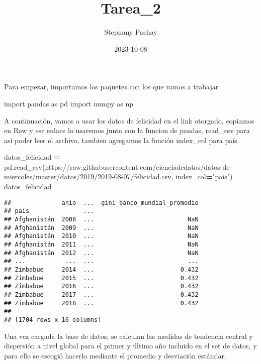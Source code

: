 \documentclass[
]{article}
\title{Tarea\_2}
\author{Stephany Pachay}
\date{2023-10-08}
\newenvironment{Shaded}{\begin{snugshade}}{\end{snugshade}}
\newcommand{\ImportTok}[1]{#1}
\newcommand{\NormalTok}[1]{#1}
\newcommand{\OperatorTok}[1]{\textcolor[rgb]{0.81,0.36,0.00}{\textbf{#1}}}
\newcommand{\StringTok}[1]{\textcolor[rgb]{0.31,0.60,0.02}{#1}}
\begin{document}
\maketitle

Para empezar, importamos los paquetes con los que vamos a trabajar

\begin{Shaded}
\begin{Highlighting}[]
\ImportTok{import}\NormalTok{ pandas }\ImportTok{as}\NormalTok{ pd}
\ImportTok{import}\NormalTok{ numpy }\ImportTok{as}\NormalTok{ np}
\end{Highlighting}
\end{Shaded}

A continuación, vamos a usar los datos de felicidad en el link otorgado,
copiamos en Raw y ese enlace lo usaremos junto con la funcion de pandas,
read\_csv para así poder leer el archivo, tambien agregamos la función
index\_col para país.

\begin{Shaded}
\begin{Highlighting}[]
\NormalTok{datos\_felicidad }\OperatorTok{=}\NormalTok{ pd.read\_csv(}\StringTok{\textquotesingle{}https://raw.githubusercontent.com/cienciadedatos/datos{-}de{-}miercoles/master/datos/2019/2019{-}08{-}07/felicidad.csv\textquotesingle{}}\NormalTok{, index\_col}\OperatorTok{=}\StringTok{"pais"}\NormalTok{)}
\NormalTok{datos\_felicidad}
\end{Highlighting}
\end{Shaded}

\begin{verbatim}
##              anio  ...  gini_banco_mundial_promedio
## pais               ...                             
## Afghanistán  2008  ...                          NaN
## Afghanistán  2009  ...                          NaN
## Afghanistán  2010  ...                          NaN
## Afghanistán  2011  ...                          NaN
## Afghanistán  2012  ...                          NaN
## ...           ...  ...                          ...
## Zimbabue     2014  ...                        0.432
## Zimbabue     2015  ...                        0.432
## Zimbabue     2016  ...                        0.432
## Zimbabue     2017  ...                        0.432
## Zimbabue     2018  ...                        0.432
## 
## [1704 rows x 16 columns]
\end{verbatim}

Una vez cargada la base de datos, se calculan las medidas de tendencia
central y dispersión a nivel global para el primer y último año incluido
en el set de datos, y para ello se escogió hacerlo mediante el promedio
y desviación estándar.
\end{document}
